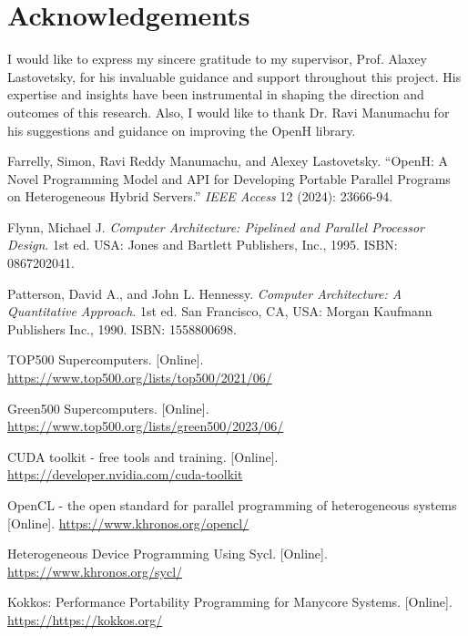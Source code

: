 \documentclass[13pt]{article}
\begin{document}
\section{Acknowledgements}
I would like to express my sincere gratitude to my supervisor, Prof. Alaxey Lastovetsky, for his invaluable guidance and support throughout this project. 
His expertise and insights have been instrumental in shaping the direction and outcomes of this research. 
Also, I would like to thank Dr. Ravi Manumachu for his suggestions and guidance on improving the OpenH library. 

\newpage
\begin{thebibliography}{9} %

    Farrelly, Simon, Ravi Reddy Manumachu, and Alexey Lastovetsky. 
    ``OpenH: A Novel Programming Model and API for Developing Portable Parallel Programs on Heterogeneous Hybrid Servers.'' 
    \textit{IEEE Access} 12 (2024): 23666-94.
    
    Flynn, Michael J. 
    \textit{Computer Architecture: Pipelined and Parallel Processor Design}. 
    1st ed. USA: Jones and Bartlett Publishers, Inc., 1995. 
    ISBN: 0867202041.
    
    Patterson, David A., and John L. Hennessy. 
    \textit{Computer Architecture: A Quantitative Approach}. 
    1st ed. San Francisco, CA, USA: Morgan Kaufmann Publishers Inc., 1990. 
    ISBN: 1558800698.

    TOP500 Supercomputers. [Online].
    \url{https://www.top500.org/lists/top500/2021/06/}

    Green500 Supercomputers. [Online].
    \url{https://www.top500.org/lists/green500/2023/06/}


    CUDA toolkit - free tools and training. [Online].
    \url{https://developer.nvidia.com/cuda-toolkit}

    OpenCL - the open standard for parallel programming of heterogeneous systems [Online].
    \url{https://www.khronos.org/opencl/}

    Heterogeneous Device Programming Using Sycl. [Online].
    \url{https://www.khronos.org/sycl/}


    Kokkos: Performance Portability Programming for Manycore Systems. [Online].
    \url{https://https://kokkos.org/}


\end{thebibliography}
\end{document}
